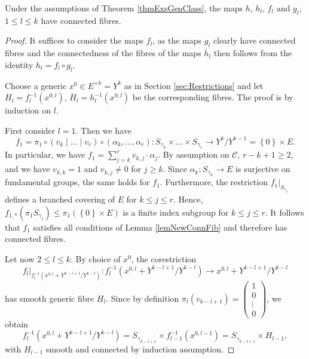 \begin{lemma}
\label{propConnGenExs}
  Under the assumptions of Theorem \ref{thmExsGenClass}, the maps $h$, $h_l$, $f_l$ and $g_l$, $1\leq l \leq k$ have connected fibres.
\end{lemma}
\begin{proof}
It suffices to consider the maps $f_l$, as the maps $g_l$ clearly have connected fibres and the connectedness of the fibres of the maps $h_l$ then follows from the identity $h_l=f_l\circ g_l$.

Choose a generic $x^0\in E^{\times k}=Y^k$ as in Section \ref{sec:Restrictions} and let $H_l=f_l^{-1}(x^{0,l})$, $\overline{H}_l=h_l^{-1}(x^{0,l})$ be the corresponding fibres. The proof is by induction on $l$.

First consider $l=1$. Then we have
\[
f_1= \pi_1 \circ \left(v_k\mid \dots \mid v_r\right) \circ \left(\alpha_k,\dots, \alpha_r\right): S_{\gamma_k}\times \dots \times S_{\gamma_r}\to Y^k/Y^{k-1}=\left\{0\right\} \times E.
\]
In particular, we have $f_1 =\sum_{j=k}^r v_{k,j}\cdot \alpha_j$. By assumption on $\mathcal{C}$, $r-k+1\geq 2$, and we have $v_{k,k}=1$ and $v_{k,j}\neq 0$ for $j\geq k$. Since $\alpha_k: S_{\gamma_k}\to E$ is surjective on fundamental groups, the same holds for $f_1$. Furthermore, the restriction $f_1|_{S_{\gamma_j}}$ defines a branched covering of $E$ for $k\leq j \leq r$. Hence, $f_{1,\ast}(\pi_1 S_{\gamma_j})\leq \pi_1 (\left\{0\right\} \times E)$ is a finite index subgroup for $k\leq j \leq r$. It follows that $f_1$ satisfies all conditions of Lemma \ref{lemNewConnFib} and therefore has connected fibres.

Let now $2\leq l \leq k$. By choice of $x^0$, the corestriction
\[
f_l|_{f_l^{-1}(x^{0,l}+ Y^{k-l+1}/Y^{k-l})}:f_l^{-1}(x^{0,l}+ Y^{k-l+1}/Y^{k-l}) \to x^{0,l}+ Y^{k-l+1}/Y^{k-l}
\]
has smooth generic fibre $H_l$. Since by definition $\pi_l(v_{k-l+1})=\left(\begin{array}{c}1\\0\\ \vdots\\ 0\end{array}\right)$, we obtain
\[
f_l^{-1}(x^{0,l}+ Y^{k-l+1}/Y^{k-l})=S_{\gamma_{k-l+1}}\times f_{l-1}^{-1}(x^{0,l-1})= S_{\gamma_{k-l+1}}\times H_{l-1},
\]
with $H_{l-1}$ smooth and connected by induction assumption.


\end{proof}
